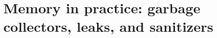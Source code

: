 \chapter{Memory in practice: garbage collectors, leaks, and sanitizers}
\label{ch:memory-in-practice-garbage-collectors}

